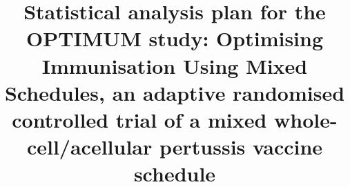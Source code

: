 \documentclass{bmcart}
\begin{document}
\begin{frontmatter}

\begin{fmbox}


\title{Statistical analysis plan for the OPTIMUM study: Optimising Immunisation Using Mixed Schedules, an adaptive randomised controlled trial of a mixed whole-cell/acellular pertussis vaccine schedule}


\author[
  addressref={aff1},                   %
  corref={aff1},                       %
  email={james.totterdell@sydney.edu.au}   %
]{}
\author[
  addressref={aff2,aff3},
  email={gladymar.perez@telethonkids.org.au}
]{}
\author[
	addressref={aff1},
	email={marie.estcourt@sydney.edu.au}
]{}
\author[
	addressref={aff1},
	email={mark.jones1@sydney.edu.au}
]{}
\author[
	addressref={aff2},
	email={peter.richmond@uwa.edu.au}
]{}
\author[
	addressref={aff1},
	email={tom.snelling@sydney.edu.au}
]{}
\author[
	addressref={aff2},
	email={julie.marsh@telethonkids.org.au}
]{}



\end{fmbox}
\end{frontmatter}
\end{document}
